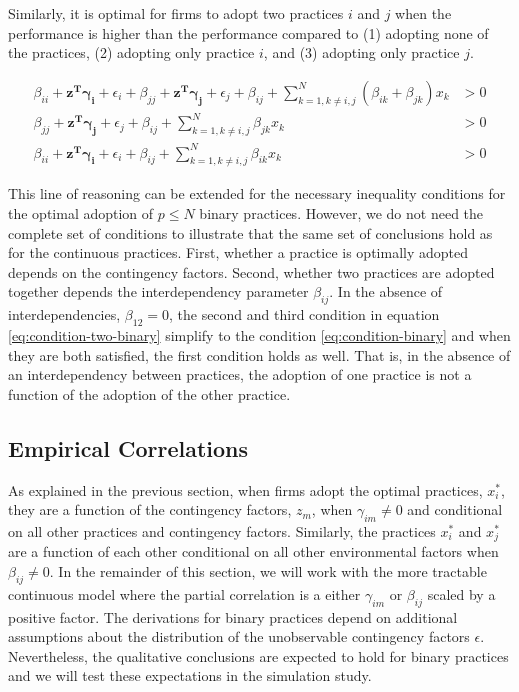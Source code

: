 \documentclass[12pt]{article}
\begin{document}
Similarly, it is optimal for firms to adopt two practices $i$ and $j$ when the performance is higher than the performance compared to (1) adopting none of the practices, (2) adopting only practice $i$, and (3) adopting only practice $j$. 

\begin{equation} \label{eq:condition-two-binary}
    \begin{aligned}
        \beta_{ii} + \mathbf{z^T} \mathbf{\gamma_i} + \epsilon_i
        + \beta_{jj} + \mathbf{z^T} \mathbf{\gamma_j} + \epsilon_j
        + \beta_{ij} + \sum^{N}_{k = 1, k \neq i,j} (\beta_{ik} + \beta_{jk}) x _k &> 0 \\
        \beta_{jj} + \mathbf{z^T} \mathbf{\gamma_j} + \epsilon_j 
        + \beta_{ij} + \sum^{N}_{k = 1, k \neq i,j} \beta_{jk} x_k &> 0 \\
        \beta_{ii} + \mathbf{z^T} \mathbf{\gamma_i} + \epsilon_i
        + \beta_{ij} + \sum^{N}_{k = 1, k \neq i,j} \beta_{ik} x_k &> 0 
    \end{aligned} 
\end{equation}

This line of reasoning can be extended for the necessary inequality conditions for the optimal adoption of $p \leq N$ binary practices. However, we do not need the complete set of conditions to illustrate that the same set of conclusions hold as for the continuous practices. First, whether a practice is optimally adopted depends on the contingency factors. Second, whether two practices are adopted together depends the interdependency parameter $\beta_{ij}$. In the absence of interdependencies, $\beta_{12} = 0$, the second and third condition in equation \eqref{eq:condition-two-binary} simplify to the condition \eqref{eq:condition-binary} and when they are both satisfied, the first condition holds as well. That is, in the absence of an interdependency between practices, the adoption of one practice is not a function of the adoption of the other practice.

\subsection{Empirical Correlations}

As explained in the previous section, when firms adopt the optimal practices, $x^*_i$, they are a function of the contingency factors, $z_m$, when $\gamma_{im} \neq 0$ and conditional on all other practices and contingency factors. Similarly, the practices $x^*_i$ and $x^*_j$ are a function of each other conditional on all other environmental factors when $\beta_{ij} \neq 0$. In the remainder of this section, we will work with the more tractable continuous model where the partial correlation is a either $\gamma_{im}$ or $\beta_{ij}$ scaled by a positive factor. The derivations for binary practices depend on additional assumptions about the distribution of the unobservable contingency factors $\epsilon$. Nevertheless, the qualitative conclusions are expected to hold for binary practices and we will test these expectations in the simulation study.
\end{document}
